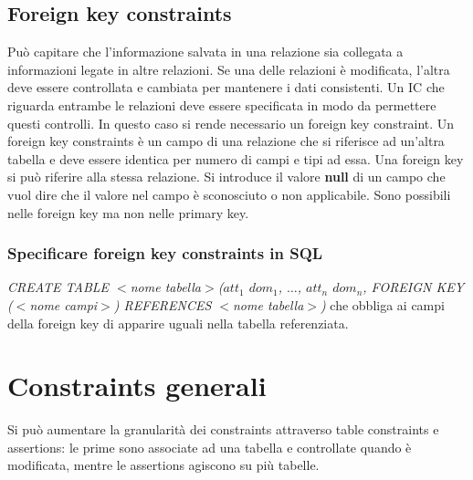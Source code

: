 \subsection{Foreign key constraints}
Pu\`o capitare che l'informazione salvata in una relazione sia collegata a informazioni legate in altre relazioni. Se una delle relazioni \`e modificata, l'altra deve essere controllata e cambiata per mantenere i dati 
consistenti. Un IC che riguarda entrambe le relazioni deve essere specificata in modo da permettere questi controlli. In questo caso si rende necessario un foreign key constraint. Un foreign key constraints
\`e un campo di una relazione che si riferisce ad un'altra tabella e deve essere identica per numero di campi e tipi ad essa. Una foreign key si pu\`o riferire alla stessa relazione. Si introduce il valore \textbf{null}
di un campo che vuol dire che il valore nel campo \`e sconosciuto o non applicabile. Sono possibili nelle foreign key ma non nelle primary key. 
\subsubsection{Specificare foreign key constraints in SQL}
\emph{CREATE TABLE $<$nome tabella$>$($att_1$  $dom_1$, $\dots$, $att_n$  $dom_n$, FOREIGN KEY ($<$nome campi$>$) REFERENCES $<$nome tabella$>$)} che obbliga ai campi della foreign
key di apparire uguali nella tabella referenziata. 
\section{Constraints generali}
Si pu\`o aumentare la granularit\`a dei constraints attraverso table constraints e assertions: le prime sono associate ad una tabella e controllate quando \`e modificata, mentre le assertions agiscono su pi\`u tabelle. 
